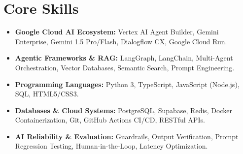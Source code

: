 \documentclass[a4paper,10pt]{article}
\begin{document}
\section{Core Skills}
\begin{itemize}
  \item \textbf{Google Cloud AI Ecosystem:} Vertex AI Agent Builder, Gemini Enterprise, Gemini 1.5 Pro/Flash, Dialogflow CX, Google Cloud Run.
  \item \textbf{Agentic Frameworks \& RAG:} LangGraph, LangChain, Multi-Agent Orchestration, Vector Databases, Semantic Search, Prompt Engineering.
  \item \textbf{Programming Languages:} Python 3, TypeScript, JavaScript (Node.js), SQL, HTML5/CSS3.
  \item \textbf{Databases \& Cloud Systems:} PostgreSQL, Supabase, Redis, Docker Containerization, Git, GitHub Actions CI/CD, RESTful APIs.
  \item \textbf{AI Reliability \& Evaluation:} Guardrails, Output Verification, Prompt Regression Testing, Human-in-the-Loop, Latency Optimization.
\end{itemize}
\end{document}
